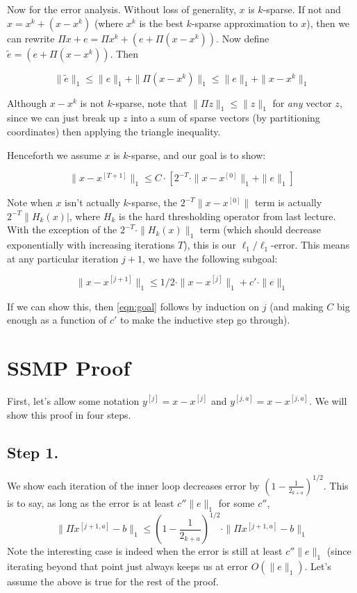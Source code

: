 \documentclass[11pt]{article}
\begin{document}
Now for the error analysis. Without loss of generality, $x$ is $k$-sparse. If not and $x = x^k + (x-x^k)$ (where $x^k$ is the best $k$-sparse approximation to $x$), then we can rewrite $\Pi x + e = \Pi x^k + (e + \Pi(x - x^k))$.  Now define $\tilde{e} = (e + \Pi(x - x^k))$. Then

\begin{equation}
\|\tilde{e}\|_1 \le \|e\|_1 + \|\Pi (x - x^k)\|_1 \le \|e\|_1 + \|x - x^k\|_1
\end{equation}

Although $x - x^k$ is not $k$-sparse, note that $\|\Pi z\|_1 \le \|z\|_1$ for {\em any} vector $z$, since we can just break up $z$ into a sum of sparse vectors (by partitioning coordinates) then applying the triangle inequality.

Henceforth we assume $x$ is $k$-sparse, and our goal is to show:

\begin{equation}
\|x - x^{[T + 1]}\|_1 \le C\cdot [ 2^{-T} \cdot \|x - x^{[0]}\|_1 + \|e\|_1] \label{eqn:goal}
\end{equation}

Note when $x$ isn't actually $k$-sparse, the $2^{-T}\|x-x^{[0]}\|$ term is actually $2^{-T}\|H_k(x)|$, where $H_k$ is the hard thresholding operator from last lecture. With the exception of the $2^{-T} \cdot \|H_k(x)\|_1$ term (which should decrease exponentially with increasing iterations $T$), this is our $\ell_1/\ell_1$-error. This means at any particular iteration $j + 1$, we have the following subgoal:

\begin{equation}
\|x - x^{[j + 1]}\|_1 \le 1/2 \cdot \|x - x^{[j]}\|_1 + c' \cdot \|e\|_1
\end{equation}

If we can show this, then \eqref{eqn:goal} follows by induction on $j$ (and making $C$ big enough as a function of $c'$ to make the inductive step go through).

\section{SSMP Proof}
First, let's allow some notation $y^{[j]} = x - x^{[j]}$ and $y^{[j,a]} = x - x^{[j,a]}$.
We will show this proof in four steps.

\subsection{Step 1.}
We show each iteration of the inner loop decreases error by $(1 - \frac{1}{2_{k + a}})^{1/2}$. This is to say, as long as the error is at least $c''\|e\|_1$  for some $c''$,
\begin{equation}
\|\Pi x^{[j + 1, a]} - b\|_1 \le (1 - \frac{1}{2_{k + a}})^{1/2} \cdot \|\Pi x^{[j + 1, a]} - b\|_1
\end{equation}
Note the interesting case is indeed when the error is still at least $c''\|e\|_1$ (since iterating beyond that point just always keeps us at error $O(\|e\|_1)$. Let's assume the above is true for the rest of the proof.
\end{document}
